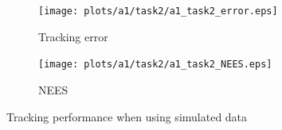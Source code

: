 \begin{figure}
    \centering
    \hspace*{-2cm}\begin{adjustbox}{minipage=0.8\linewidth, scale=1}
        \begin{subfigure}{.5\textwidth}
            \texttt{[image: plots/a1/task2/a1\_task2\_error.eps]}
            \caption{Tracking error}
            \label{fig:task22_tracking_error}
        \end{subfigure}
        \begin{subfigure}{.5\textwidth}
            \texttt{[image: plots/a1/task2/a1\_task2\_NEES.eps]}
            \caption{NEES}
            \label{fig:task22_NEES}
        \end{subfigure}
    \end{adjustbox}
        \caption{Tracking performance when using simulated data}
\end{figure}
